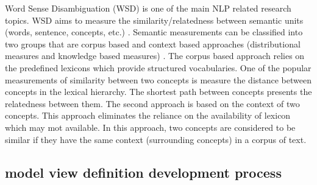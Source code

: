 \documentclass[NewProceedings, InsideFigs]{ascelike} %
\begin{document}
Word Sense Disambiguation (WSD) is one of the main NLP related research topics. WSD aims to measure the similarity/relatedness between semantic units (words, sentence, concepts, etc.) \cite{harispe15}. Semantic measurements can be classified into two groups that are corpus based and context based approaches (distributional measures and knowledge based measures) \cite{Harispe13}. The corpus based approach relies on the predefined lexicons which provide structured vocabularies. One of the popular measurements of similarity between two concepts is measure the distance between concepts in the lexical hierarchy. The shortest path between concepts presents the relatedness between them. The second approach is based on the context of two concepts. This approach eliminates the reliance on the availability of lexicon which may mot available. In this approach, two concepts are considered to be similar if they have the same context (surrounding concepts) in a corpus of text.





\subsection{model view definition development process}
\end{document}
